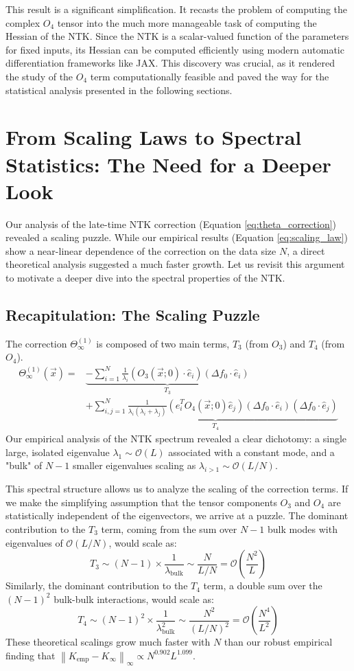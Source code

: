 \documentclass{article}
\newcommand{\norm}[1]{\left\lVert#1\right\rVert}
\newcommand{\Order}{\mathcal{O}}
\begin{document}
This result is a significant simplification. It recasts the problem of computing the complex $O_4$ tensor into the much more manageable task of computing the Hessian of the NTK. Since the NTK is a scalar-valued function of the parameters for fixed inputs, its Hessian can be computed efficiently using modern automatic differentiation frameworks like JAX. This discovery was crucial, as it rendered the study of the $O_4$ term computationally feasible and paved the way for the statistical analysis presented in the following sections.

\newpage
\section{From Scaling Laws to Spectral Statistics: The Need for a Deeper Look}

Our analysis of the late-time NTK correction (Equation \ref{eq:theta_correction}) revealed a scaling puzzle. While our empirical results (Equation \ref{eq:scaling_law}) show a near-linear dependence of the correction on the data size $N$, a direct theoretical analysis suggested a much faster growth. Let us revisit this argument to motivate a deeper dive into the spectral properties of the NTK.

\subsection{Recapitulation: The Scaling Puzzle}
The correction $\Theta^{(1)}_\infty$ is composed of two main terms, $T_3$ (from $O_3$) and $T_4$ (from $O_4$).
\begin{align*}
\Theta^{(1)}_\infty(\vec{x}) = & \underbrace{-\sum_{i=1}^N \frac{1}{\lambda_{i}}(O_{3}(\vec{x};0)\cdot\hat{e}_{i})(\Delta f_{0}\cdot\hat{e}_{i})}_{T_3} \\
& + \underbrace{\sum_{i,j=1}^N\frac{1}{\lambda_{i}(\lambda_{i}+\lambda_{j})}(\hat{e}_{i}^{T}O_{4}(\vec{x};0)\hat{e}_{j})(\Delta f_{0}\cdot \hat{e}_{i})(\Delta f_{0}\cdot \hat{e}_{j})}_{T_4}
\end{align*}
Our empirical analysis of the NTK spectrum revealed a clear dichotomy: a single large, isolated eigenvalue $\lambda_1 \sim \Order(L)$ associated with a constant mode, and a "bulk" of $N-1$ smaller eigenvalues scaling as $\lambda_{i>1} \sim \Order(L/N)$.

This spectral structure allows us to analyze the scaling of the correction terms. If we make the simplifying assumption that the tensor components $O_3$ and $O_4$ are statistically independent of the eigenvectors, we arrive at a puzzle. The dominant contribution to the $T_3$ term, coming from the sum over $N-1$ bulk modes with eigenvalues of $\Order(L/N)$, would scale as:
\[ T_3 \sim (N-1) \times \frac{1}{\lambda_{\text{bulk}}} \sim \frac{N}{L/N} = \Order\left(\frac{N^2}{L}\right) \]
Similarly, the dominant contribution to the $T_4$ term, a double sum over the $(N-1)^2$ bulk-bulk interactions, would scale as:
\[ T_4 \sim (N-1)^2 \times \frac{1}{\lambda_{\text{bulk}}^2} \sim \frac{N^2}{(L/N)^2} = \Order\left(\frac{N^4}{L^2}\right) \]
These theoretical scalings grow much faster with $N$ than our robust empirical finding that $\norm{K_{\text{emp}} - K_{\infty}}_\infty \propto N^{0.902} L^{1.099}$.
\end{document}
